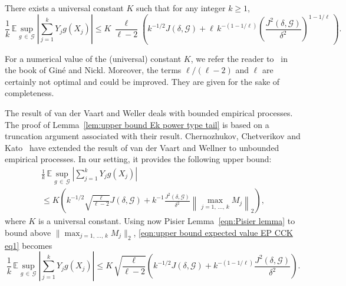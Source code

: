 \documentclass[AHL,Unicode,longabstracts,published]{cedram}
\newcommand{\bE}{\mathbb{E}}
\newcommand{\cG}{\mathcal{G}}
\newcommand{\caG}{\mathscr{G}}
\begin{document}
\begin{lemm}\label{lem:upper bound Ek power type tail}
There exists a universal constant $K$ such that for any integer $k\geq 1$,
\[
\frac{1}{k}\,\bE\sup_{g\,\in\,\caG}\left|\sum_{j=1}^k Y_jg(X_j)\right| \leq K\,\frac{\ell}{\ell-2}\left(k^{-1/2}J(\delta,\caG) +\ell\,k^{-(1-1/\ell)}\left(\dfrac{J^2(\delta,\caG)}{\delta^2}\right)^{1-1/\ell}\,\right).
\]
\end{lemm}

\begin{rema}
For a numerical value of the (universal) constant $K$, we refer the reader to~\cite[Section~3.5.1]{GN16} in the book of Giné and Nickl. Moreover, the terms $\ell/(\ell-2)$ and $\ell$ are certainly not optimal and could be improved. They are given for the sake of completeness.
\end{rema}

The result of van der Vaart and Weller deals with bounded empirical processes. The proof of Lemma~\ref{lem:upper bound Ek power type tail} is based on a truncation argument associated with their result. Chernozhukov, Chetverikov and Kato~\cite[Theorem~5.2]{CCK14} have extended the result of van der Vaart and Wellner to unbounded empirical processes. In our setting, it provides the following upper bound:
\begin{multline}\label{eqn:upper bound expected value EP CCK eq1}
\frac{1}{k}\,\bE\sup_{g\,\in\,\caG}\left|\sum_{j=1}^k Y_jg(X_j)\right| \\ \leq K\left(k^{-1/2}\sqrt{\frac{\ell}{\ell-2}} J(\delta,\cG)+k^{-1}\frac{J^2(\delta,\cG)}{\delta^2}\left\|\max_{j=1,\,\ldots,\,k}M_j\right\|_2\right),
\end{multline}
where $K$ is a universal constant. Using now Pisier Lemma~\eqref{eqn:Pisier lemma} to bound above $\|\max_{j=1,\,\ldots,\,k}M_j\|_2$, \eqref{eqn:upper bound expected value EP CCK eq1} becomes
\begin{equation}\label{eqn:upper bound expected value EP CCK eq2}
\frac{1}{k}\,\bE\sup_{g\,\in\,\caG}\left|\sum_{j=1}^k Y_jg(X_j)\right| \leq K\,\sqrt{\frac{\ell}{\ell-2}}\left(k^{-1/2} J(\delta,\cG)+k^{-(1-1/\ell)}\frac{J^2(\delta,\cG)}{\delta^2}\right).
\end{equation}
\end{document}
